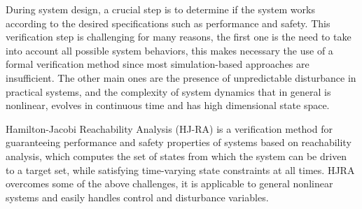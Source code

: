 During system design, a crucial step is to determine if the system works according to the desired specifications such as performance and safety. This verification step is challenging for many reasons, the first one is the need to take into account all possible system behaviors, this makes necessary the use of a formal verification method since most simulation-based approaches are insufficient. The other main ones are the presence of unpredictable disturbance in practical systems, and the complexity of system dynamics that in general is nonlinear, evolves in continuous time and has high dimensional state space.

Hamilton-Jacobi Reachability Analysis (HJ-RA) is a verification method for guaranteeing performance and safety properties of systems based on reachability analysis, which computes the set of states from which the system can be driven to a target set, while satisfying time-varying state constraints at all times. HJRA overcomes some of the above challenges, it is applicable to general nonlinear systems and easily handles control and disturbance variables. 

